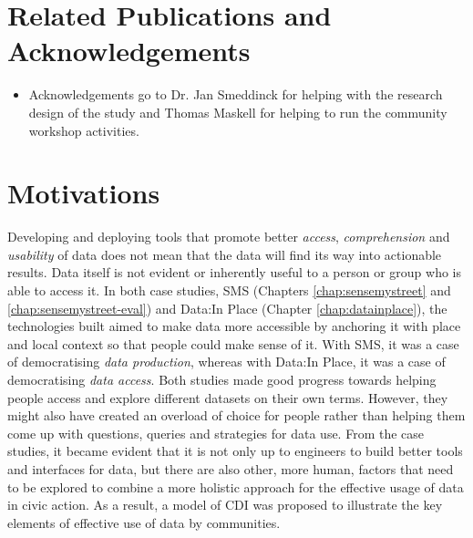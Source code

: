 \section*{Related Publications and Acknowledgements}
\begin{itemize}
\item Acknowledgements go to Dr. Jan Smeddinck for helping with the research design of the study and Thomas Maskell for helping to run the community workshop activities.
\end{itemize}
\clearpage

\section{Motivations}
Developing and deploying tools that promote better \textit{access}, \textit{comprehension} and \textit{usability} of data does not mean that the data will find its way into actionable results. Data itself is not evident or inherently useful \citep{gitelman_raw_2013} to a person or group who is able to access it. In both case studies, SMS (Chapters \ref{chap:sensemystreet} and \ref{chap:sensemystreet-eval}) and Data:In Place (Chapter \ref{chap:datainplace}), the technologies built aimed to make data more accessible by anchoring it with place and local context so that people could make sense of it. With SMS, it was a case of democratising \textit{data production}, whereas with Data:In Place, it was a case of democratising \textit{data access}. Both studies made good progress towards helping people access and explore different datasets on their own terms. However, they might also have created an overload of choice for people rather than helping them come up with questions, queries and strategies for data use. From the case studies, it became evident that it is not only up to engineers to build better tools and interfaces for data, but there are also other, more human, factors that need to be explored to combine a more holistic approach for the effective usage of data in civic action. As a result, a model of CDI was proposed to illustrate the key elements of effective use of data by communities.

